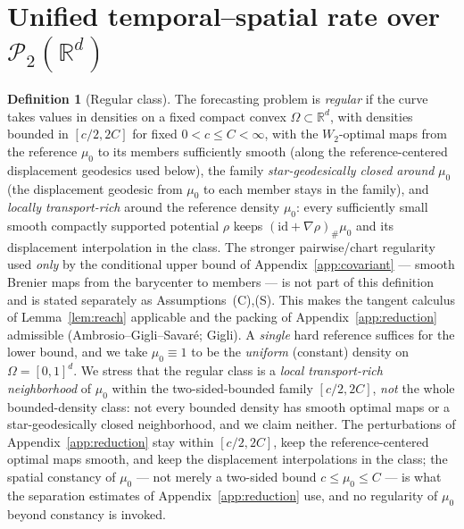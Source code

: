 \documentclass[11pt]{article}
\theoremstyle{definition}
\newtheorem{definition}{Definition}
\theoremstyle{remark}
\newcommand{\R}{\mathbb{R}}
\newcommand{\PP}{\mathcal{P}_2(\R^d)}
\begin{document}
\section{Unified temporal--spatial rate over $\PP$}\label{sec:unified}

\begin{definition}[Regular class]\label{def:reg}
The forecasting problem is \emph{regular} if the curve takes values in densities on a fixed compact
convex $\Omega\subset\R^d$, with densities bounded in $[c/2,2C]$ for fixed $0<c\le C<\infty$, with the
$W_2$-optimal maps from the reference $\mu_0$ to its members sufficiently smooth (along the
reference-centered displacement geodesics used below), the family \emph{star-geodesically closed
around} $\mu_0$
(the displacement geodesic from $\mu_0$ to each member stays in the family), and \emph{locally
transport-rich} around the reference density $\mu_0$: every sufficiently small smooth compactly
supported potential $\rho$ keeps $(\mathrm{id}+\nabla\rho)_\#\mu_0$ and its displacement
interpolation in the class. The stronger pairwise/chart regularity used \emph{only} by the
conditional upper bound of Appendix~\ref{app:covariant} --- smooth Brenier maps from the barycenter to
members --- is not part of this definition and is stated separately as Assumptions~(C),(S). This makes the tangent calculus of Lemma~\ref{lem:reach} applicable and
the packing of Appendix~\ref{app:reduction} admissible (Ambrosio--Gigli--Savar\'e; Gigli). A
\emph{single} hard reference suffices for the lower bound, and we take $\mu_0\equiv1$ to be the
\emph{uniform} (constant) density on $\Omega=[0,1]^d$. We stress that the regular class is a
\emph{local transport-rich neighborhood} of $\mu_0$ within the two-sided-bounded family $[c/2,2C]$,
\emph{not} the whole bounded-density class: not every bounded density has smooth optimal maps or a
star-geodesically closed neighborhood, and we claim neither. The perturbations of
Appendix~\ref{app:reduction} stay within $[c/2,2C]$, keep the reference-centered optimal maps smooth, and keep the
displacement interpolations in the class; the spatial constancy of $\mu_0$ --- not merely a two-sided
bound $c\le\mu_0\le C$ --- is what the separation estimates of Appendix~\ref{app:reduction} use, and
no regularity of $\mu_0$ beyond constancy is invoked.
\end{definition}
\end{document}
